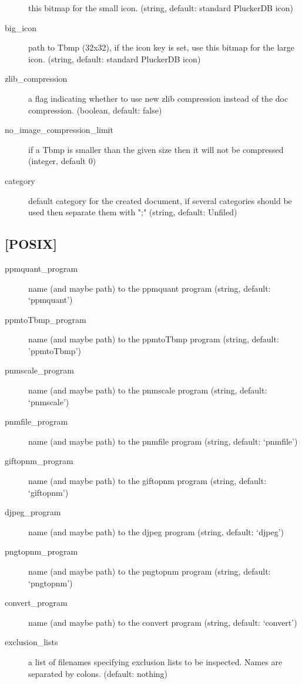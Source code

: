 \begin{description}
this bitmap for the small icon. (string, default: standard PluckerDB icon)
\item[big\_icon] path to Tbmp (32x32), if the icon key is set, use
this bitmap for the large icon. (string, default: standard PluckerDB icon)
\item[zlib\_compression] a flag indicating whether to use new zlib
compression instead of the doc compression. (boolean, default: false)
\item[no\_image\_compression\_limit] if a Tbmp is smaller than the given
size then it will not be compressed (integer, default 0)
\item[category] default category for the created document, if several 
categories should be used then separate them with ";" (string, default: Unfiled)

\end{description}


\subsection{[POSIX]}

\begin{description}
\item[ppmquant\_program] name (and maybe path) to the ppmquant program
(string, default: `ppmquant')
\item[ppmtoTbmp\_program] name (and maybe path) to the ppmtoTbmp program
(string, default: '\mbox{ppmtoTbmp}')
\item[pnmscale\_program] name (and maybe path) to the pnmscale program
(string, default: `pnmscale')
\item[pnmfile\_program] name (and maybe path) to the pnmfile program
(string, default: `pnmfile')
\item[giftopnm\_program] name (and maybe path) to the giftopnm program
(string, default: `giftopnm')
\item[djpeg\_program] name (and maybe path) to the djpeg program
(string, default: `djpeg')
\item[pngtopnm\_program] name (and maybe path) to the pngtopnm program
(string, default: `pngtopnm')
\item[convert\_program] name (and maybe path) to the convert program
(string, default: `convert')
\item[exclusion\_lists] a list of filenames specifying exclusion lists to 
be inspected.  Names are separated by colons. (default: nothing)
\end{description}


